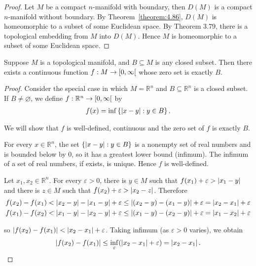 \begin{proof}
	Let $M$ be a compact $n$-manifold with boundary, then $D(M)$ is a compact $n$-manifold without boundary. By Theorem~\ref{theorem:4.86}, $D(M)$ is homeomorphic to a subset of some Euclidean space. By Theorem 3.79, there is a topological embedding from $M$ into $D(M)$. Hence $M$ is homeomorphic to a subset of some Euclidean space.
\end{proof}

\begin{theorem}{4.88}\label{theorem:4.88}
	Suppose $M$ is a topological manifold, and $B\subseteq M$ is any closed subset. Then there exists a continuous function $f: M \to \left[{0, \infty}\right[$ whose zero set is exactly $B$.
\end{theorem}

\begin{proof}
	Consider the special case in which $M = \mathbb{R}^{n}$ and $B\subseteq \mathbb{R}^{n}$ is a closed subset. If $B\ne \varnothing$, we define $f: \mathbb{R}^{n} \to \left[{0, \infty}\right[$ by
	\begin{align*}
		f(x) = \inf\left\{{\left\vert{x - y}\right\vert: y\in B}\right\}.
	\end{align*}

	We will show that $f$ is well-defined, continuous and the zero set of $f$ is exactly $B$.

	For every $x\in \mathbb{R}^{n}$, the set $\left\{{ \left\vert{x - y}\right\vert: y\in B }\right\}$ is a nonempty set of real numbers and is bounded below by 0, so it has a greatest lower bound (infimum). The infimum of a set of real numbers, if exists, is unique. Hence $f$ is well-defined.

	Let $x_{1}, x_{2}\in \mathbb{R}^{n}$. For every $\varepsilon > 0$, there is $y\in M$ such that $f(x_{1}) + \varepsilon > \left\vert{x_{1} - y}\right\vert$ and there is $z\in M$ such that $f(x_{2}) + \varepsilon > \left\vert{x_{2} - z}\right\vert$. Therefore
	\begin{align*}
		 & f(x_{2}) - f(x_{1}) < \left\vert{x_{2} - y}\right\vert - \left\vert{x_{1} - y}\right\vert + \varepsilon \leq \left\vert{(x_{2} - y) - (x_{1} - y)}\right\vert + \varepsilon = \left\vert{x_{2} - x_{1}}\right\vert + \varepsilon \\
		 & f(x_{1}) - f(x_{2}) < \left\vert{x_{1} - y}\right\vert - \left\vert{x_{2} - y}\right\vert + \varepsilon \leq \left\vert{(x_{1} - y) - (x_{2} - y)}\right\vert + \varepsilon = \left\vert{x_{1} - x_{2}}\right\vert + \varepsilon
	\end{align*}

	so $\left\vert{f(x_{2}) - f(x_{1})}\right\vert < \left\vert{x_{2} - x_{1}}\right\vert + \varepsilon$. Taking infimum (as $\varepsilon > 0$ varies), we obtain
	\begin{align*}
		\left\vert{f(x_{2}) - f(x_{1})}\right\vert \leq \inf\limits_{\varepsilon} (\left\vert{x_{2} - x_{1}}\right\vert + \varepsilon) = \left\vert{x_{2} - x_{1}}\right\vert.
	\end{align*}


\end{proof}
